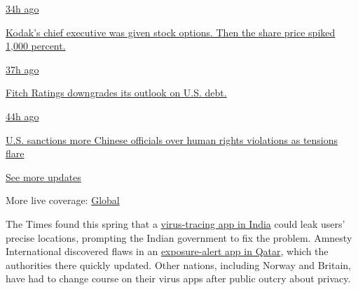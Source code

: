 \href{https://www.nytimes.com/live/2020/07/31/business/stock-market-today-coronavirus?action=click\&pgtype=Article\&state=default\&region=MAIN_CONTENT_1\&context=storylines_live_updates\#kodaks-chief-executive-was-given-stock-options-then-the-share-price-spiked-1000-percent}{34h
ago}

\href{https://www.nytimes.com/live/2020/07/31/business/stock-market-today-coronavirus?action=click\&pgtype=Article\&state=default\&region=MAIN_CONTENT_1\&context=storylines_live_updates\#kodaks-chief-executive-was-given-stock-options-then-the-share-price-spiked-1000-percent}{Kodak's
chief executive was given stock options. Then the share price spiked
1,000 percent.}

\href{https://www.nytimes.com/live/2020/07/31/business/stock-market-today-coronavirus?action=click\&pgtype=Article\&state=default\&region=MAIN_CONTENT_1\&context=storylines_live_updates\#fitch-ratings-downgrades-its-outlook-on-us-debt}{37h
ago}

\href{https://www.nytimes.com/live/2020/07/31/business/stock-market-today-coronavirus?action=click\&pgtype=Article\&state=default\&region=MAIN_CONTENT_1\&context=storylines_live_updates\#fitch-ratings-downgrades-its-outlook-on-us-debt}{Fitch
Ratings downgrades its outlook on U.S. debt.}

\href{https://www.nytimes.com/live/2020/07/31/business/stock-market-today-coronavirus?action=click\&pgtype=Article\&state=default\&region=MAIN_CONTENT_1\&context=storylines_live_updates\#us-sanctions-more-chinese-officials-over-human-rights-violations-as-tensions-flare}{44h
ago}

\href{https://www.nytimes.com/live/2020/07/31/business/stock-market-today-coronavirus?action=click\&pgtype=Article\&state=default\&region=MAIN_CONTENT_1\&context=storylines_live_updates\#us-sanctions-more-chinese-officials-over-human-rights-violations-as-tensions-flare}{U.S.
sanctions more Chinese officials over human rights violations as
tensions flare}

\href{https://www.nytimes.com/live/2020/07/31/business/stock-market-today-coronavirus?action=click\&pgtype=Article\&state=default\&region=MAIN_CONTENT_1\&context=storylines_live_updates}{See
more updates}

More live coverage:
\href{https://www.nytimes.com/2020/08/01/world/coronavirus-covid-19.html?action=click\&pgtype=Article\&state=default\&region=MAIN_CONTENT_1\&context=storylines_live_updates}{Global}

The Times found this spring that a
\href{https://www.nytimes.com/2020/04/29/business/coronavirus-cellphone-apps-contact-tracing.html}{virus-tracing
app in India} could leak users' precise locations, prompting the Indian
government to fix the problem. Amnesty International discovered flaws in
an
\href{https://www.amnesty.org/en/latest/news/2020/05/qatar-covid19-contact-tracing-app-security-flaw/}{exposure-alert
app in Qatar}, which the authorities there quickly updated. Other
nations, including Norway and Britain, have had to change course on
their virus apps after public outcry about privacy.

